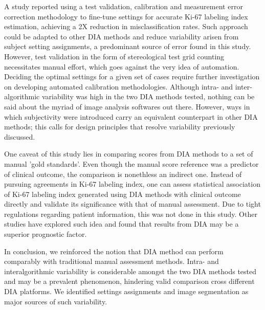 \documentclass[final,5p,times,twocolumn]{elsarticle}
\begin{document}
A study reported using a test validation, calibration and measurement error correction methodology to fine-tune settings for accurate Ki-67 labeling index estimation, achieving a 2X reduction in misclassification rates. \cite{Laurinavicius2014} Such approach could be adapted to other DIA methods and reduce variability arisen from subject setting assignments, a predominant source of error found in this study. However, test validation in the form of stereological test grid counting necessitates manual effort, which goes against the very idea of automation. Deciding the optimal settings for a given set of cases require further investigation on developing automated calibration methodologies. Although intra- and inter-algorithmic variability was high in the two DIA methods tested, nothing can be said about the myriad of image analysis softwares out there. However, ways in which subjectivity were introduced carry an equivalent counterpart in other DIA methods; this calls for design principles that resolve variability previously discussed.

One caveat of this study lies in comparing scores from DIA methods to a set of manual {'gold standards'}. Even though the manual score reference was a predictor of clinical outcome, the comparison is nonethless an indirect one. Instead of pursuing agreements in Ki-67 labeling index, one can assess statistical association of Ki-67 labeling index generated using DIA methods with clinical outcome directly and validate its significance with that of manual assessment. Due to tight regulations regarding patient information, this was not done in this study. Other studies have explored such idea and found that results from DIA may be a superior prognostic factor. \cite{Stalhammar2016}

In conclusion, we reinforced the notion that DIA method can perform comparably with traditional manual assessment methods. Intra- and interalgorithmic variability is considerable amongst the two DIA methods tested and may be a prevalent phenomenon, hindering valid comparison cross different DIA platforms. We identified settings assignments and image segmentation as major sources of such variability.



\printbibliography
\end{document}
